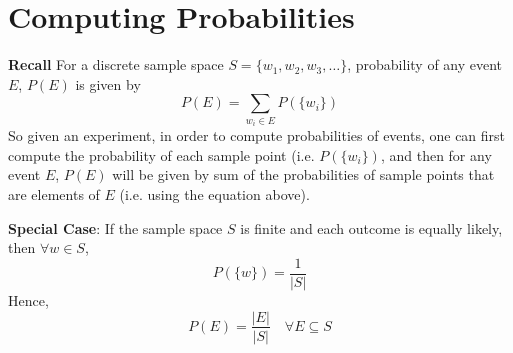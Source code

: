 \section{Computing Probabilities}
\noindent \textbf{Recall}
For a discrete sample space $S = \lbrace w_1, w_2, w_3, \dots \rbrace$,
probability of any event $E$, $P(E)$ is given by 
\begin{equation*}
    P(E) = \sum_{w_i \in E} P(\lbrace w_i \rbrace)
\end{equation*}
So given an experiment, in order to compute probabilities of events, one can
first compute the probability of each sample point (i.e. $P(\lbrace w_i
\rbrace)$, and then for any event $E$, $P(E)$ will be given by sum of the
probabilities of sample points that are elements of $E$ (i.e. using the
equation above).

\noindent \textbf{Special Case}: If the sample space $S$ is finite and each
outcome is equally likely, then $\forall w \in S$, 
\begin{equation*}
    P(\lbrace w \rbrace) = \frac{1}{\vert S \vert}
\end{equation*}
Hence, 
\begin{equation*}
    P(E) = \frac{\vert E \vert}{\vert S \vert} \quad \forall E \subseteq S
\end{equation*}

